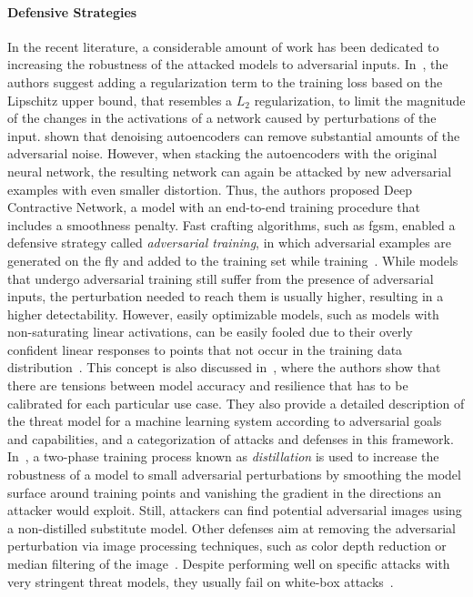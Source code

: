 \paragraph{Defensive Strategies}
In the recent literature, a considerable amount of work has been dedicated to increasing the robustness of the attacked models to adversarial inputs.
In~\cite{szegedy2013intriguing}, the authors suggest adding a regularization term to the training loss based on the Lipschitz upper bound, that resembles a $L_2$ regularization, to limit the magnitude of the changes in the activations of a network caused by perturbations of the input.
\citet{gu2014towards} shown that denoising autoencoders can remove substantial amounts of the adversarial noise.
However, when stacking the autoencoders with the original neural network, the resulting network can again be attacked by new adversarial examples with even smaller distortion.
Thus, the authors proposed Deep Contractive Network, a model with an end-to-end training procedure that includes a smoothness penalty.
Fast crafting algorithms, such as \gls{fgsm}, enabled a defensive strategy called \emph{adversarial training}, in which adversarial examples are generated on the fly and added to the training set while training~\cite{goodfellow2014explaining,huang2015learning}.
While models that undergo adversarial training still suffer from the presence of adversarial inputs, the perturbation needed to reach them is usually higher, resulting in a higher detectability.
However, easily optimizable models, such as models with non-saturating linear activations, can be easily fooled due to their overly confident linear responses to points that not occur in the training data distribution~\cite{goodfellow2014explaining}.
This concept is also discussed in~\cite{papernot2016towards}, where the authors show that there are tensions between model accuracy and resilience that has to be calibrated for each particular use case.
They also provide a detailed description of the threat model for a machine learning system according to adversarial goals and capabilities, and a categorization of attacks and defenses in this framework.
In~\cite{papernot2015distillation,papernot2016distillation}, a two-phase training process known as \emph{distillation} is used to increase the robustness of a model to small adversarial perturbations by smoothing the model surface around training points and vanishing the gradient in the directions an attacker would exploit.
Still, attackers can find potential adversarial images using a non-distilled substitute model.
Other defenses aim at removing the adversarial perturbation via image processing techniques, such as color depth reduction or median filtering of the image~\cite{xu2017feature,li2017adversarial}.
Despite performing well on specific attacks with very stringent threat models, they usually fail on white-box attacks~\cite{he2017adversarial}.


